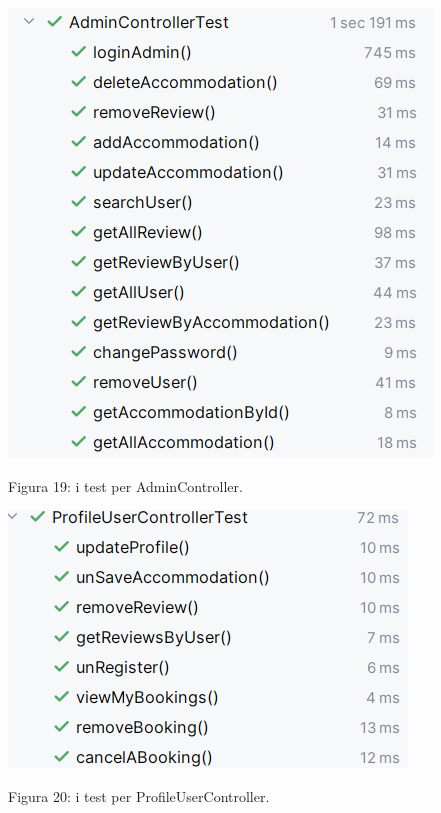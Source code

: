 \documentclass[10pt]{article}
\begin{document}
\begin{center}
\includegraphics[scale=0.55]{test/BusinessLogic/testAdminController}
\par\medskip
Figura 19: i test per AdminController.
\par\medskip
\end{center}

\begin{center}
\includegraphics[scale=0.55]{test/BusinessLogic/testProfileUserController}
\par\medskip
Figura 20: i test per ProfileUserController.
\par\medskip
\end{center}
\end{document}
